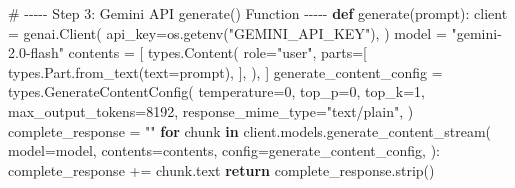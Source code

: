 \documentclass[
  12pt,
  letterpaper,
  DIV=11,
  numbers=noendperiod]{scrartcl}
\newenvironment{Shaded}{\begin{snugshade}}{\end{snugshade}}
\newcommand{\CommentTok}[1]{\textcolor[rgb]{0.37,0.37,0.37}{#1}}
\newcommand{\ControlFlowTok}[1]{\textcolor[rgb]{0.00,0.23,0.31}{\textbf{#1}}}
\newcommand{\DecValTok}[1]{\textcolor[rgb]{0.68,0.00,0.00}{#1}}
\newcommand{\KeywordTok}[1]{\textcolor[rgb]{0.00,0.23,0.31}{\textbf{#1}}}
\newcommand{\NormalTok}[1]{\textcolor[rgb]{0.00,0.23,0.31}{#1}}
\newcommand{\OperatorTok}[1]{\textcolor[rgb]{0.37,0.37,0.37}{#1}}
\newcommand{\StringTok}[1]{\textcolor[rgb]{0.13,0.47,0.30}{#1}}
\begin{document}
\begin{Shaded}
\begin{Highlighting}[]
\CommentTok{\# {-}{-}{-}{-}{-} Step 3: Gemini API generate() Function {-}{-}{-}{-}{-}}
\KeywordTok{def}\NormalTok{ generate(prompt):}
\NormalTok{    client }\OperatorTok{=}\NormalTok{ genai.Client(}
\NormalTok{        api\_key}\OperatorTok{=}\NormalTok{os.getenv(}\StringTok{"GEMINI\_API\_KEY"}\NormalTok{),}
\NormalTok{    )}
\NormalTok{    model }\OperatorTok{=} \StringTok{"gemini{-}2.0{-}flash"}
\NormalTok{    contents }\OperatorTok{=}\NormalTok{ [}
\NormalTok{        types.Content(}
\NormalTok{            role}\OperatorTok{=}\StringTok{"user"}\NormalTok{,}
\NormalTok{            parts}\OperatorTok{=}\NormalTok{[}
\NormalTok{                types.Part.from\_text(text}\OperatorTok{=}\NormalTok{prompt),}
\NormalTok{            ],}
\NormalTok{        ),}
\NormalTok{    ]}
\NormalTok{    generate\_content\_config }\OperatorTok{=}\NormalTok{ types.GenerateContentConfig(}
\NormalTok{        temperature}\OperatorTok{=}\DecValTok{0}\NormalTok{,}
\NormalTok{        top\_p}\OperatorTok{=}\DecValTok{0}\NormalTok{,}
\NormalTok{        top\_k}\OperatorTok{=}\DecValTok{1}\NormalTok{,}
\NormalTok{        max\_output\_tokens}\OperatorTok{=}\DecValTok{8192}\NormalTok{,}
\NormalTok{        response\_mime\_type}\OperatorTok{=}\StringTok{"text/plain"}\NormalTok{,}
\NormalTok{    )}
\NormalTok{    complete\_response }\OperatorTok{=} \StringTok{""}
    \ControlFlowTok{for}\NormalTok{ chunk }\KeywordTok{in}\NormalTok{ client.models.generate\_content\_stream(}
\NormalTok{        model}\OperatorTok{=}\NormalTok{model,}
\NormalTok{        contents}\OperatorTok{=}\NormalTok{contents,}
\NormalTok{        config}\OperatorTok{=}\NormalTok{generate\_content\_config,}
\NormalTok{    ):}
\NormalTok{        complete\_response }\OperatorTok{+=}\NormalTok{ chunk.text}
    \ControlFlowTok{return}\NormalTok{ complete\_response.strip()}


\end{Highlighting}
\end{Shaded}
\end{document}
